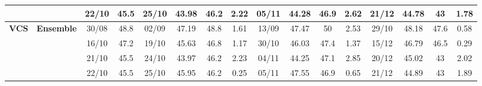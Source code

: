 \begin{table}[!h]
\begin{tabular}{llcc|cccc|cccc|cccc}
&
& 22/10 & 45.5 & 25/10 & 43.98 & 46.2 & 2.22 & 05/11 & 44.28 & 46.9 & 2.62 & 21/12 & 44.78 & 43 & 1.78 \\
\midrule



\multirow{4}{*}{\textbf{VCS}} 
& \textbf{Ensemble}
& 30/08 & 48.8 & 02/09 & 47.19 & 48.8 & 1.61 & 13/09 & 47.47 & 50 & 2.53 & 29/10 & 48.18 & 47.6 & 0.58 \\

&
& 16/10 & 47.2 & 19/10 & 45.63 & 46.8 & 1.17 & 30/10 & 46.03 & 47.4 & 1.37 & 15/12 & 46.79 & 46.5 & 0.29 \\

&
& 21/10 & 45.5 & 24/10 & 43.97 & 46.2 & 2.23 & 04/11 & 44.25 & 47.1 & 2.85 & 20/12 & 45.02 & 43 & 2.02 \\

&
& 22/10 & 45.5 & 25/10 & 45.95 & 46.2 & 0.25 & 05/11 & 47.55 & 46.9 & 0.65 & 21/12 & 44.89 & 43 & 1.89 \\


\bottomrule
\end{tabular}
\end{table}
